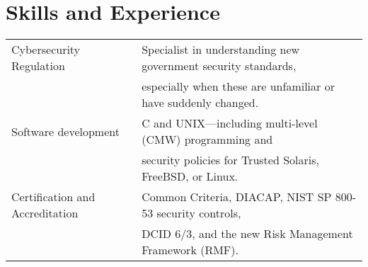 \section*{Skills and Experience}

\vspace{-2mm}
\begin{tabular*}{\textwidth}{@{}ll@{}}
    \hline
    \rule{0pt}{5mm}Cybersecurity Regulation & Specialist in understanding
        new government security standards, \\
        & especially when these are unfamiliar or have suddenly changed.
            \vspace{1.5mm} \\

    Software development & C and UNIX---including multi-level (CMW) programming and \\
        & security policies for Trusted Solaris, FreeBSD, or Linux. \vspace{1.5mm} \\

    \rule[-2mm]{0pt}{1em}Certification and Accreditation & Common Criteria,
        DIACAP, NIST SP 800-53 security controls, \\
        & \rule[-3mm]{0pt}{0pt}DCID 6/3, and the new Risk Management Framework (RMF). \\

    \hline
\end{tabular*}

